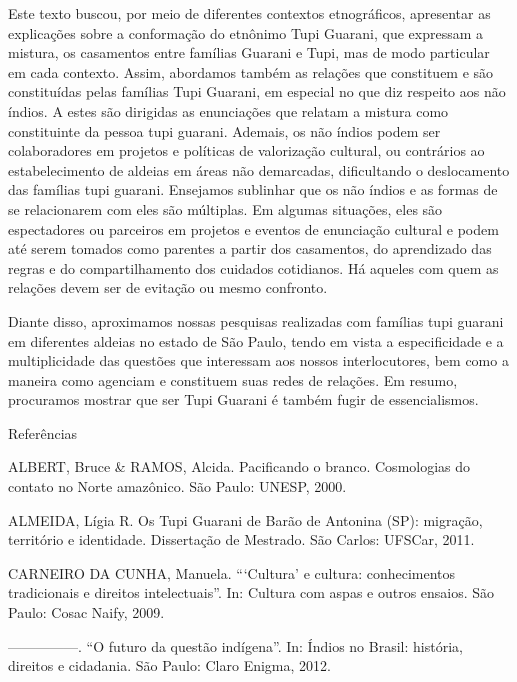 \documentclass{article}
\begin{document}
Este texto buscou, por meio de diferentes contextos etnogr\'aficos,
apresentar as explica\c{c}\~oes sobre a conforma\c{c}\~ao do etn\^onimo
Tupi Guarani, que expressam a mistura, os casamentos entre fam\'ilias
Guarani e Tupi, mas de modo particular em cada contexto. Assim,
abordamos tamb\'em as rela\c{c}\~oes que constituem e s\~ao
constitu\'idas pelas fam\'ilias Tupi Guarani, em especial no que diz
respeito aos n\~ao \'indios. A estes s\~ao dirigidas as
enuncia\c{c}\~oes que relatam a mistura como constituinte da pessoa
tupi guarani. Ademais, os n\~ao \'indios podem ser colaboradores em
projetos e pol\'iticas de valoriza\c{c}\~ao cultural, ou contr\'arios
ao estabelecimento de aldeias em \'areas n\~ao demarcadas, dificultando
o deslocamento das fam\'ilias tupi guarani. Ensejamos sublinhar que os
n\~ao \'indios e as formas de se relacionarem com eles s\~ao
m\'ultiplas. Em algumas situa\c{c}\~oes, eles s\~ao espectadores ou
parceiros em projetos e eventos de enuncia\c{c}\~ao cultural e podem
at\'e serem tomados como parentes a partir dos casamentos, do
aprendizado das regras e do compartilhamento dos cuidados cotidianos.
H\'a aqueles com quem as rela\c{c}\~oes devem ser de evita\c{c}\~ao ou
mesmo confronto.

Diante disso, aproximamos nossas pesquisas realizadas com fam\'ilias
tupi guarani em diferentes aldeias no estado de S\~ao Paulo, tendo em
vista a especificidade e a multiplicidade das quest\~oes que interessam
aos nossos interlocutores, bem como a maneira como agenciam e
constituem suas redes de rela\c{c}\~oes. Em resumo, procuramos mostrar
que ser Tupi Guarani \'e tamb\'em fugir de essencialismos.

Refer\^encias

ALBERT, Bruce \& RAMOS, Alcida. Pacificando o branco. Cosmologias do
contato no Norte amaz\^onico. S\~ao Paulo: UNESP, 2000.

ALMEIDA, L\'igia R. Os Tupi Guarani de Bar\~ao de Antonina (SP):
migra\c{c}\~ao, territ\'orio e identidade. Disserta\c{c}\~ao de
Mestrado. S\~ao Carlos: UFSCar, 2011.

CARNEIRO DA CUNHA, Manuela.
{\textquotedblleft}{\textquoteleft}Cultura{\textquoteright} e cultura:
conhecimentos tradicionais e direitos intelectuais{\textquotedblright}.
In: Cultura com aspas e outros ensaios. S\~ao Paulo: Cosac Naify, 2009.


{}---{}---{}---{}---{}---. {\textquotedblleft}O futuro da quest\~ao
ind\'igena{\textquotedblright}. In: \'Indios no Brasil: hist\'oria,
direitos e cidadania. S\~ao Paulo: Claro Enigma, 2012.
\end{document}
